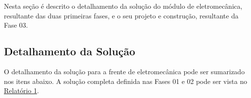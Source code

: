  \label{desenvolvimento_eletromecanica}
Nesta seção é descrito o detalhamento da solução do módulo de eletromecânica, resultante das duas primeiras fases, 
e o seu projeto e construção, resultante da Fase 03.

\subsection{Detalhamento da Solução}

O detalhamento da solução para a frente de eletromecânica pode ser sumarizado nos itens abaixo. A solução completa definida nas 
  Fases 01 e 02 pode ser vista no \href{https://drive.google.com/file/d/0B5InkGKx6O-MR1B3eVYzZFpjQ3c/view?usp=sharing}{Relatório 1}.







